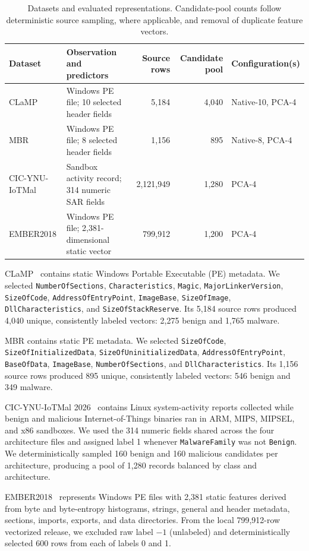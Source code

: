 \documentclass[letterpaper]{article} %
\begin{document}
\begin{table}[t]
\centering
\small
\caption{Datasets and evaluated representations. Candidate-pool counts follow deterministic source sampling, where applicable, and removal of duplicate feature vectors.}
\label{tab:dataset-design}
\begin{tabular}{lp{2.75in}rrl}
\toprule
Dataset & Observation and predictors & Source rows & Candidate pool & Configuration(s) \\
\midrule
CLaMP & Windows PE file; 10 selected header fields & 5,184 & 4,040 & Native-10, PCA-4 \\
MBR & Windows PE file; 8 selected header fields & 1,156 & 895 & Native-8, PCA-4 \\
CIC-YNU-IoTMal & Sandbox activity record; 314 numeric SAR fields & 2,121,949 & 1,280 & PCA-4 \\
EMBER2018 & Windows PE file; 2,381-dimensional static vector & 799,912 & 1,200 & PCA-4 \\
\bottomrule
\end{tabular}
\end{table}

CLaMP~\cite{clamp} contains static Windows Portable Executable (PE) metadata. We selected \texttt{NumberOfSections}, \texttt{Characteristics}, \texttt{Magic}, \texttt{MajorLinkerVersion}, \texttt{SizeOfCode}, \texttt{AddressOfEntryPoint}, \texttt{ImageBase}, \texttt{SizeOfImage}, \texttt{DllCharacteristics}, and \texttt{SizeOfStackReserve}. Its 5,184 source rows produced 4,040 unique, consistently labeled vectors: 2,275 benign and 1,765 malware.

MBR contains static PE metadata. We selected \texttt{SizeOfCode}, \texttt{SizeOfInitializedData}, \texttt{SizeOfUninitializedData}, \texttt{AddressOfEntryPoint}, \texttt{BaseOfData}, \texttt{ImageBase}, \texttt{NumberOfSections}, and \texttt{DllCharacteristics}. Its 1,156 source rows produced 895 unique, consistently labeled vectors: 546 benign and 349 malware.

CIC-YNU-IoTMal 2026~\cite{cic} contains Linux system-activity reports collected while benign and malicious Internet-of-Things binaries ran in ARM, MIPS, MIPSEL, and x86 sandboxes. We used the 314 numeric fields shared across the four architecture files and assigned label 1 whenever \texttt{MalwareFamily} was not \texttt{Benign}. We deterministically sampled 160 benign and 160 malicious candidates per architecture, producing a pool of 1,280 records balanced by class and architecture.

EMBER2018~\cite{ember2018} represents Windows PE files with 2,381 static features derived from byte and byte-entropy histograms, strings, general and header metadata, sections, imports, exports, and data directories. From the local 799,912-row vectorized release, we excluded raw label $-1$ (unlabeled) and deterministically selected 600 rows from each of labels 0 and 1.
\end{document}
